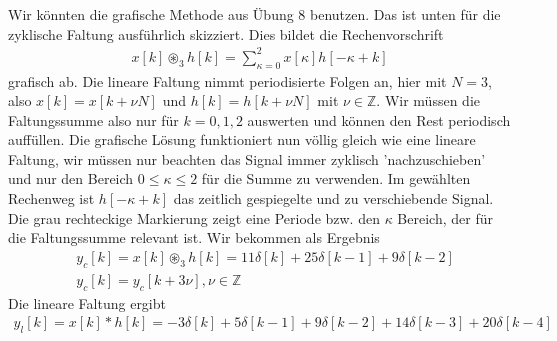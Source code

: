 \begin{Ansatz}
Wir könnten die grafische Methode aus Übung 8 benutzen. Das ist unten
für die zyklische Faltung ausführlich skizziert.
Dies bildet die Rechenvorschrift
\begin{align}
x[k] \circledast_3 h[k] = \sum_{\kappa=0}^{2} x[\kappa] h[-\kappa + k]
\end{align}
grafisch ab.
Die lineare Faltung nimmt periodisierte Folgen an, hier mit $N=3$, also
$x[k] = x[k+\nu N]$ und $h[k] = h[k+\nu N]$ mit $\nu\in\mathbb{Z}$.
Wir müssen die Faltungssumme also nur für $k=0,1,2$ auswerten und können
den Rest periodisch auffüllen.
%
Die grafische Lösung funktioniert nun völlig gleich wie eine lineare Faltung,
wir müssen nur beachten das Signal immer zyklisch 'nachzuschieben' und nur den
Bereich $0 \leq \kappa \leq 2$ für die Summe zu verwenden.
%
Im gewählten Rechenweg ist $h[-\kappa+k]$ das zeitlich gespiegelte und zu
verschiebende Signal.
%
Die grau rechteckige Markierung zeigt eine Periode bzw. den $\kappa$ Bereich,
der für die Faltungssumme relevant ist.
%
Wir bekommen als Ergebnis
\begin{align}
&y_c[k] = x[k] \circledast_3 h[k] = 11\delta[k] + 25\delta[k-1] + 9\delta[k-2]\nonumber\\
&y_c[k] = y_c[k + 3\nu], \nu\in\mathbb{Z}
\end{align}
%
Die lineare Faltung ergibt
\begin{align}
y_l[k] = x[k] \ast h[k] = -3\delta[k] + 5\delta[k-1] + 9\delta[k-2] + 14\delta[k-3] + 20\delta[k-4]
\end{align}
%
\end{Ansatz}

